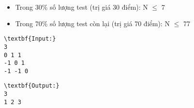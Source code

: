 \begin{itemize}
	\item Trong 30\% số lượng test (trị giá 30 điểm): N  $\le$  7
	\item Trong 70\% số lượng test còn lại (trị giá 70 điểm): N  $\le$  77
\end{itemize}
\begin{verbatim}
\textbf{Input:}
3
0 1 1
-1 0 1
-1 -1 0\end{verbatim}
\begin{verbatim}
\textbf{Output:}
3
1 2 3\end{verbatim}